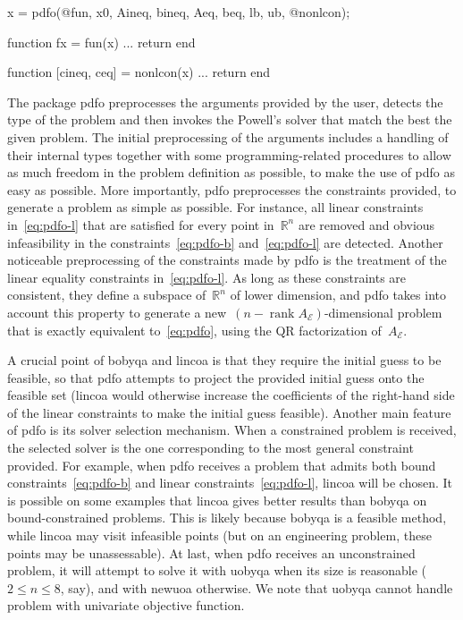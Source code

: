 \documentclass[11pt,draft]{article}
\numberwithin{equation}{section}
\DeclareMathOperator\rank{rank}
\newcommand{\R}{\mathbb{R}}
\newcommand{\aeq}{A_{\scriptscriptstyle\mathcal{E}}}
\def\matlab{\mbox{MATLAB}}
\begin{document}
\begin{matlablst}[%
    caption=An elementary example of PDFO in \matlab.,
    label=lst:minex
]
    x = pdfo(@fun, x0, Aineq, bineq, Aeq, beq, lb, ub, @nonlcon);

    function fx = fun(x)
    ...
    return
    end

    function [cineq, ceq] = nonlcon(x)
    ...
    return
    end
\end{matlablst}

The package \gls{pdfo} preprocesses the arguments provided by the user, detects the type of the problem and then invokes the Powell's solver that match the best the given problem.
The initial preprocessing of the arguments includes a handling of their internal types together with some programming-related procedures to allow as much freedom in the problem definition as possible, to make
the use of \gls{pdfo} as easy as possible.
More importantly, \gls{pdfo} preprocesses the constraints provided, to generate a problem as simple as possible.
For instance, all linear constraints in~\eqref{eq:pdfo-l} that are satisfied for every point in~$\R^n$ are removed and obvious infeasibility in the constraints~\eqref{eq:pdfo-b} and~\eqref{eq:pdfo-l} are detected.
Another noticeable preprocessing of the constraints made by \gls{pdfo} is the treatment of the linear equality constraints in~\eqref{eq:pdfo-l}.
As long as these constraints are consistent, they define a subspace of~$\R^n$ of lower dimension, and \gls{pdfo} takes into account this property to generate a new~$(n - \rank \aeq)$-dimensional problem that is exactly equivalent to~\eqref{eq:pdfo}, using the QR factorization of~$\aeq$.

A crucial point of \gls{bobyqa} and \gls{lincoa} is that they require the initial guess to be feasible, so that \gls{pdfo} attempts to project the provided initial guess onto the feasible set (\gls{lincoa} would otherwise increase the coefficients of the right-hand side of the linear constraints to make the initial guess feasible).
Another main feature of \gls{pdfo} is its solver selection mechanism.
When a constrained problem is received, the selected solver is the one corresponding to the most general constraint provided.
For example, when \gls{pdfo} receives a problem that admits both bound constraints~\eqref{eq:pdfo-b} and linear constraints~\eqref{eq:pdfo-l}, \gls{lincoa} will be chosen.
It is possible on some examples that \gls{lincoa} gives better results than \gls{bobyqa} on bound-constrained problems.
This is likely because \gls{bobyqa} is a feasible method, while \gls{lincoa} may visit infeasible points (but on an engineering problem, these points may be unassessable).
At last, when \gls{pdfo} receives an unconstrained problem, it will attempt to solve it with \gls{uobyqa} when its size is reasonable ($2 \le n \le 8$, say), and with \gls{newuoa} otherwise.
We note that \gls{uobyqa} cannot handle problem with univariate objective function.
\end{document}
